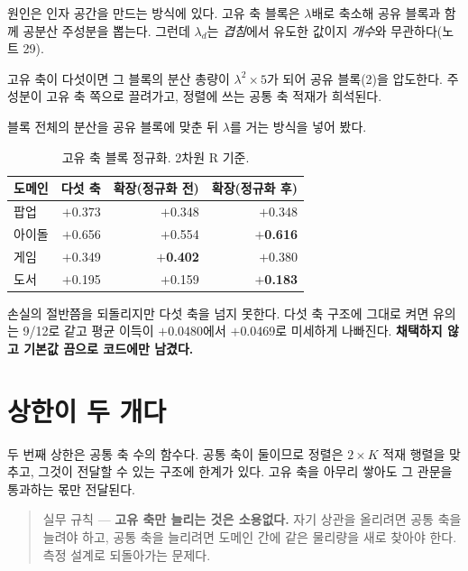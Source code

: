 \documentclass[10pt]{article}
\begin{document}
원인은 인자 공간을 만드는 방식에 있다. 고유 축 블록은 $\lambda$배로 축소해
공유 블록과 함께 공분산 주성분을 뽑는다. 그런데 $\lambda_d$는 \emph{겹침}에서
유도한 값이지 \emph{개수}와 무관하다(노트 29).

고유 축이 다섯이면 그 블록의 분산 총량이 $\lambda^2\!\times\!5$가 되어 공유
블록(2)을 압도한다. 주성분이 고유 축 쪽으로 끌려가고, 정렬에 쓰는 공통 축
적재가 희석된다.

블록 전체의 분산을 공유 블록에 맞춘 뒤 $\lambda$를 거는 방식을 넣어 봤다.

\begin{table}[t]
\centering\tsize
\caption{고유 축 블록 정규화. 2차원 R 기준.}
\begin{tabular}{lrrr}
\toprule
도메인 & 다섯 축 & 확장(정규화 전) & 확장(정규화 후) \\
\midrule
팝업 & $+$0.373 & $+$0.348 & $+$0.348 \\
아이돌 & $+$0.656 & $+$0.554 & \textbf{$+$0.616} \\
게임 & $+$0.349 & \textbf{$+$0.402} & $+$0.380 \\
도서 & $+$0.195 & $+$0.159 & \textbf{$+$0.183} \\
\bottomrule
\end{tabular}
\end{table}

손실의 절반쯤을 되돌리지만 다섯 축을 넘지 못한다. 다섯 축 구조에 그대로 켜면
유의는 9/12로 같고 평균 이득이 $+$0.0480에서 $+$0.0469로 미세하게 나빠진다.
\textbf{채택하지 않고 기본값 끔으로 코드에만 남겼다.}

\section{상한이 두 개다}


두 번째 상한은 공통 축 수의 함수다. 공통 축이 둘이므로 정렬은 $2\times K$
적재 행렬을 맞추고, 그것이 전달할 수 있는 구조에 한계가 있다. 고유 축을 아무리
쌓아도 그 관문을 통과하는 몫만 전달된다.

\begin{quote}\fontsize{9.5}{11.5}\selectfont
실무 규칙 --- \textbf{고유 축만 늘리는 것은 소용없다.} 자기 상관을 올리려면
공통 축을 늘려야 하고, 공통 축을 늘리려면 도메인 간에 같은 물리량을 새로
찾아야 한다. 측정 설계로 되돌아가는 문제다.
\end{quote}
\end{document}
